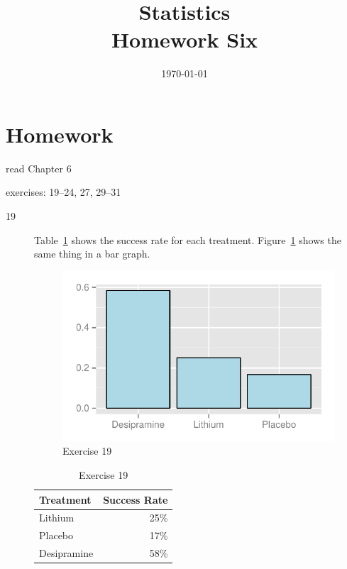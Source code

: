 \documentclass[letterpaper, landscape]{exam}
\title{Statistics \\ Homework Six}
\date{\today}
\author{}
\begin{document}
  \maketitle

  \section{Homework}
    \begin{itemize*}
      \item read Chapter 6 
      \item exercises: 19--24, 27, 29--31
    \end{itemize*}

  \ifprintanswers{}
    \begin{description}

      \item[19] Table~\ref{tab:ex19} shows the success rate for each treatment. 
        Figure~\ref{fig:ex19} shows the same thing in a bar graph.

        \begin{figure}[H]
          \centering
          \includegraphics[scale = 0.7]{figures/ex19.pdf}
          \caption{Exercise 19}\label{fig:ex19}
        \end{figure}

        \begin{table}[H]
          \centering
          \begin{tabular}{lr}
            \toprule
            Treatment   & Success Rate \\
            \midrule
            Lithium     & 25\% \\
            Placebo     & 17\% \\
            Desipramine & 58\% \\
            \bottomrule
          \end{tabular}
          \caption{Exercise 19}\label{tab:ex19}
        \end{table}


\end{description}
\end{document}

